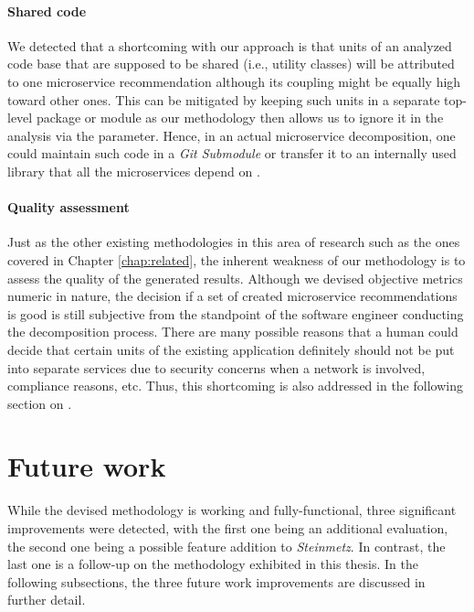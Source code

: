 \documentclass[12pt,a4paper]{report}
\begin{document}
\paragraph{Shared code}
We detected that a shortcoming with our approach is
that units of an analyzed code base that are supposed to be shared (i.e.,
utility classes) will be attributed to one microservice recommendation although
its coupling might be equally high toward other ones. This can be mitigated by
keeping such units in a separate top-level package or module as our methodology
then allows us to ignore it in the analysis via the 
parameter. Hence, in an actual microservice decomposition, one could maintain
such code in a \textit{Git Submodule} or transfer it to an internally
used library that all the microservices depend on \cite{git-submodules}.

\paragraph{Quality assessment}
Just as the other existing methodologies in this
area of research such as the ones covered in Chapter \ref{chap:related}, the
inherent weakness of our methodology is to assess the quality of the generated
results. Although we devised objective metrics numeric in nature, the decision
if a set of created microservice recommendations is good is still subjective
from the standpoint of the software engineer conducting the decomposition
process. There are many possible reasons that a human could decide that certain
units of the existing application definitely should not be put into separate
services due to security concerns when a network is involved, compliance
reasons, etc. Thus, this shortcoming is also addressed in the following section
on \textit{}.



\section{Future work} \label{sect:future-work}

While the devised methodology is working and fully-functional, three
significant improvements were detected, with the first one being an additional
evaluation, the second one being a possible feature addition to \textit{Steinmetz}.
In contrast, the last one is a follow-up on the methodology
exhibited in this thesis. In the following subsections, the three future work
improvements are discussed in further detail.
\end{document}
